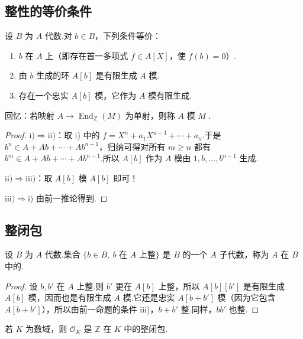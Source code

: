 \subsection{整性的等价条件}\label{sec:nt-2-2-3}
\begin{proposition*}
设 $B$ 为 $A$ 代数.对 $b\in B$，下列条件等价：
\begin{enumerate}[label=\roman*)]
\item $b$ 在 $A$ 上（即存在首一多项式 $f\in A[X]$，使 $f(b)=0$）.
\item 由 $b$ 生成的环 $A[b]$ 是有限生成 $A$ 模.
\item 存在一个忠实 $A[b]$ 模，它作为 $A$ 模有限生成.
\end{enumerate}
\end{proposition*}
回忆：若映射 $A\longrightarrow\operatorname{End}_{\mathbb Z}(M)$ 为单射，则称 $A$ 模 $M$ .
\begin{proof}
$\mathrm{i)}\Rightarrow\mathrm{ii)}$：取 i) 中的 $f=X^n+a_1X^{n-1}+\cdots+a_n$.于是 $b^n\in A+Ab+\cdots+Ab^{n-1}$，归纳可得对所有 $m\ge n$ 都有 $b^m\in A+Ab+\cdots+Ab^{n-1}$.所以 $A[b]$ 作为 $A$ 模由 $1,b,\ldots,b^{n-1}$ 生成.

$\mathrm{ii)}\Rightarrow\mathrm{iii)}$：取 $A[b]$ 模 $A[b]$ 即可！

$\mathrm{iii)}\Rightarrow\mathrm{i)}$ 由前一推论得到.
\end{proof}

\subsection{整闭包}\label{sec:nt-2-2-4}
\begin{corollary*}
设 $B$ 为 $A$ 代数.集合 $\{b\in B,\ b\text{ 在 }A\text{ 上整}\}$ 是 $B$ 的一个 $A$ 子代数，称为 $A$ 在 $B$ 中的.
\end{corollary*}
\begin{proof}
设 $b,b'$ 在 $A$ 上整.则 $b'$ 更在 $A[b]$ 上整，所以 $A[b][b']$ 是有限生成 $A[b]$ 模，因而也是有限生成 $A$ 模.它还是忠实 $A[b+b']$ 模（因为它包含 $A[b+b']$），所以由前一命题的条件 iii)，$b+b'$ 整.同样，$bb'$ 也整.
\end{proof}
\begin{example*}
若 $K$ 为数域，则 $\mathcal O_K$ 是 $\mathbb Z$ 在 $K$ 中的整闭包.
\end{example*}

